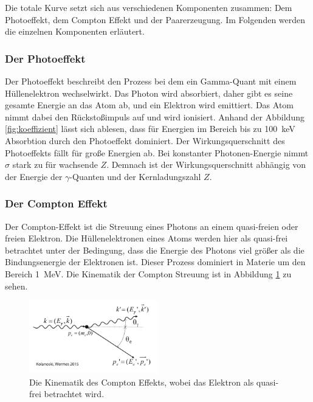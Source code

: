 Die totale Kurve setzt sich aus verschiedenen Komponenten zusammen: Dem Photoeffekt, dem Compton Effekt und der Paarerzeugung.
Im Folgenden werden die einzelnen Komponenten erläutert.

\subsubsection{Der Photoeffekt}
\label{sec:photoeffekt}

Der Photoeffekt beschreibt den Prozess bei dem ein Gamma-Quant mit einem Hüllenelektron wechselwirkt.
Das Photon wird absorbiert, daher gibt es seine gesamte Energie an das Atom ab, und ein Elektron wird emittiert. 
Das Atom nimmt dabei den Rückstoßimpuls auf und wird ionisiert.
Anhand der Abbildung \ref{fig:koeffizient} lässt sich ablesen, dass für Energien im Bereich bis zu \qty{100}{\kilo\eV} 
Absorbtion durch den Photoeffekt dominiert. Der Wirkungsquerschnitt des Photoeffekts fällt für große Energien ab.
Bei konstanter Photonen-Energie nimmt $\sigma$ stark zu für wachsende $Z$.
Demnach ist der Wirkungsquerschnitt abhängig von der Energie der $\gamma$-Quanten und der Kernladungszahl $Z$.

\subsubsection{Der Compton Effekt}
\label{sec:compton}

Der Compton-Effekt ist die Streuung eines Photons an einem quasi-freien oder freien Elektron.
Die Hüllenelektronen eines Atoms werden hier als quasi-frei betrachtet unter der Bedingung, dass
die Energie des Photons viel größer als die Bindungsenergie der Elektronen ist. Dieser Prozess
dominiert in Materie um den Bereich \qty{1}{\mega\eV}.
Die Kinematik der Compton Streuung ist in Abbildung \ref{fig:compton} zu sehen.

\begin{figure}[H]
    \centering
    \includegraphics[width=0.5\textwidth]{content/grafik/compton.jpg}
    \caption{Die Kinematik des Compton Effekts, wobei das Elektron als quasi-frei betrachtet wird. \cite{teilchendetektoren}}
    \label{fig:compton}
\end{figure}

